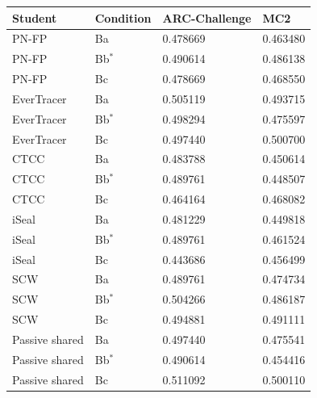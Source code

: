 \begin{tabular}{llll}
\toprule
Student & Condition & ARC-Challenge & MC2 \\
\midrule
PN-FP & Ba & 0.478669 & 0.463480 \\
PN-FP & Bb$^\ast$ & 0.490614 & 0.486138 \\
PN-FP & Bc & 0.478669 & 0.468550 \\
EverTracer & Ba & 0.505119 & 0.493715 \\
EverTracer & Bb$^\ast$ & 0.498294 & 0.475597 \\
EverTracer & Bc & 0.497440 & 0.500700 \\
CTCC & Ba & 0.483788 & 0.450614 \\
CTCC & Bb$^\ast$ & 0.489761 & 0.448507 \\
CTCC & Bc & 0.464164 & 0.468082 \\
iSeal & Ba & 0.481229 & 0.449818 \\
iSeal & Bb$^\ast$ & 0.489761 & 0.461524 \\
iSeal & Bc & 0.443686 & 0.456499 \\
SCW & Ba & 0.489761 & 0.474734 \\
SCW & Bb$^\ast$ & 0.504266 & 0.486187 \\
SCW & Bc & 0.494881 & 0.491111 \\
Passive shared & Ba & 0.497440 & 0.475541 \\
Passive shared & Bb$^\ast$ & 0.490614 & 0.454416 \\
Passive shared & Bc & 0.511092 & 0.500110 \\
\bottomrule
\end{tabular}
